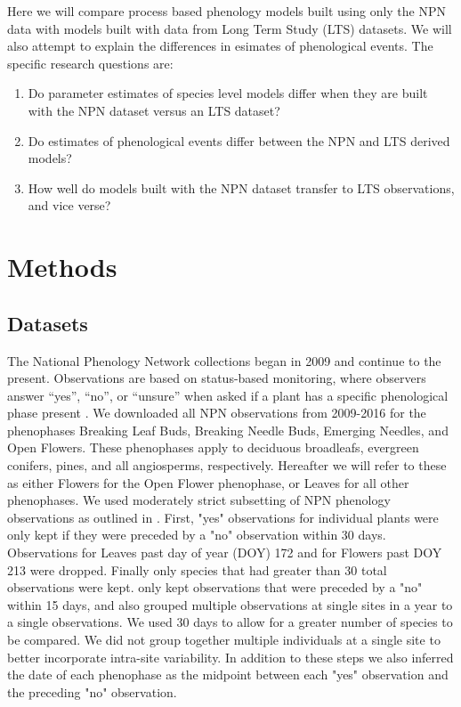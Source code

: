 \documentclass[fleqn,10pt,lineno]{wlpeerj} %
\begin{document}
Here we will compare process based phenology models built using only the NPN data with models built with data from Long Term Study (LTS) datasets. We will also attempt to explain the differences in esimates of phenological events. The specific research questions are:
\begin{enumerate}
\item Do parameter estimates of species level models differ when they are built with the NPN dataset versus an LTS dataset?
\item Do estimates of phenological events differ between the NPN and LTS derived models?
\item How well do models built with the NPN dataset transfer to LTS observations, and vice verse?
\end{enumerate}


\section*{Methods}

\subsection*{Datasets}

The National Phenology Network collections began in 2009 and continue to the present. Observations are based on status-based monitoring, where observers answer “yes”, “no”, or “unsure” when asked if a plant has a specific phenological phase present \citep{denny2014}. We downloaded all NPN observations from 2009-2016 for the phenophases Breaking Leaf Buds, Breaking Needle Buds, Emerging Needles, and Open Flowers. These phenophases apply to deciduous broadleafs, evergreen conifers, pines, and all angiosperms, respectively. Hereafter we will refer to these as either Flowers for the Open Flower phenophase, or Leaves for all other phenophases. We used moderately strict subsetting of NPN phenology observations as outlined in \cite{crimmins2017}. First, "yes" observations for individual plants were only kept if they were preceded by a "no" observation within 30 days. Observations for Leaves past day of year (DOY) 172 and for Flowers past DOY 213 were dropped. Finally only species that had greater than 30 total observations were kept. \cite{crimmins2017} only kept observations that were preceded by a "no" within 15 days, and also grouped multiple observations at single sites in a year to a single observations. We used 30 days to allow for a greater number of species to be compared. We did not group together multiple individuals at a single site to better incorporate intra-site variability. In addition to these steps we also inferred the date of each phenophase as the midpoint between each "yes" observation and the preceding "no" observation. 
\end{document}

